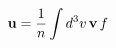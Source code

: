 \documentclass[preview]{standalone}
\begin{document}
\begin{align*}
\special{dvisvgm:raw <g id='unique000'>}\va u=\frac1n\int d^3v\,\va v\,f\special{dvisvgm:raw </g>}
\end{align*}
\end{document}
